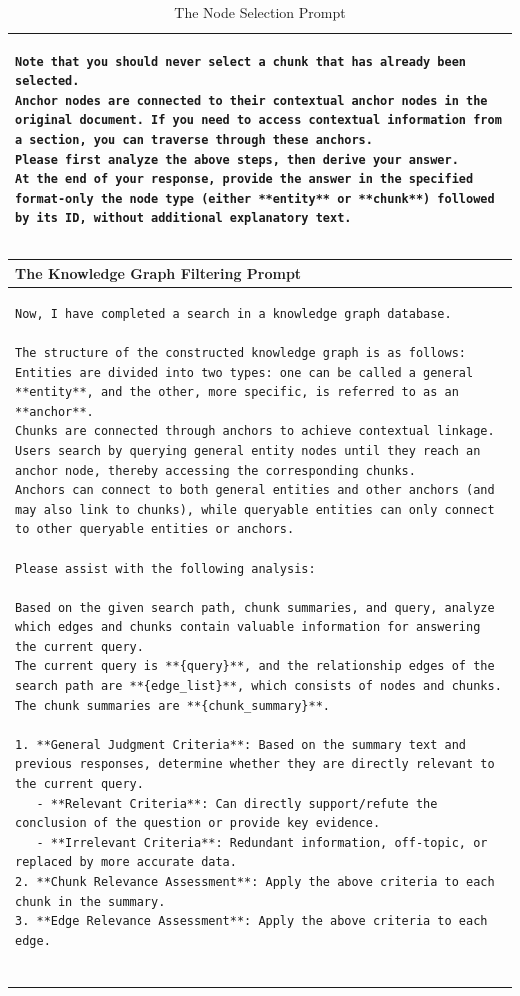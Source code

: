 \begin{table}[h]
\begin{tabular}{p{\textwidth}}
\begin{lstlisting}[basicstyle=\ttfamily\small, frame=single, breaklines=true, breakindent=0pt]
Note that you should never select a chunk that has already been selected.
Anchor nodes are connected to their contextual anchor nodes in the original document. If you need to access contextual information from a section, you can traverse through these anchors.  
Please first analyze the above steps, then derive your answer.  
At the end of your response, provide the answer in the specified format-only the node type (either **entity** or **chunk**) followed by its ID, without additional explanatory text.  
\end{lstlisting} \\
\bottomrule
\end{tabular}
\caption{The Node Selection Prompt}
\label{tab:node-selection-prompt}
\end{table}


\begin{table}[h]
\centering
\begin{tabular}{p{\textwidth}}
\toprule
\textbf{The Knowledge Graph Filtering Prompt} \\ 
\midrule
\begin{lstlisting}[basicstyle=\ttfamily\small, frame=single, breaklines=true, breakindent=0pt]
Now, I have completed a search in a knowledge graph database.  

The structure of the constructed knowledge graph is as follows:  
Entities are divided into two types: one can be called a general **entity**, and the other, more specific, is referred to as an **anchor**.  
Chunks are connected through anchors to achieve contextual linkage. Users search by querying general entity nodes until they reach an anchor node, thereby accessing the corresponding chunks.  
Anchors can connect to both general entities and other anchors (and may also link to chunks), while queryable entities can only connect to other queryable entities or anchors.  

Please assist with the following analysis:  

Based on the given search path, chunk summaries, and query, analyze which edges and chunks contain valuable information for answering the current query.  
The current query is **{query}**, and the relationship edges of the search path are **{edge_list}**, which consists of nodes and chunks. The chunk summaries are **{chunk_summary}**.  

1. **General Judgment Criteria**: Based on the summary text and previous responses, determine whether they are directly relevant to the current query.  
   - **Relevant Criteria**: Can directly support/refute the conclusion of the question or provide key evidence.  
   - **Irrelevant Criteria**: Redundant information, off-topic, or replaced by more accurate data.  
2. **Chunk Relevance Assessment**: Apply the above criteria to each chunk in the summary.  
3. **Edge Relevance Assessment**: Apply the above criteria to each edge.  


\end{lstlisting}
\end{tabular}
\end{table}
